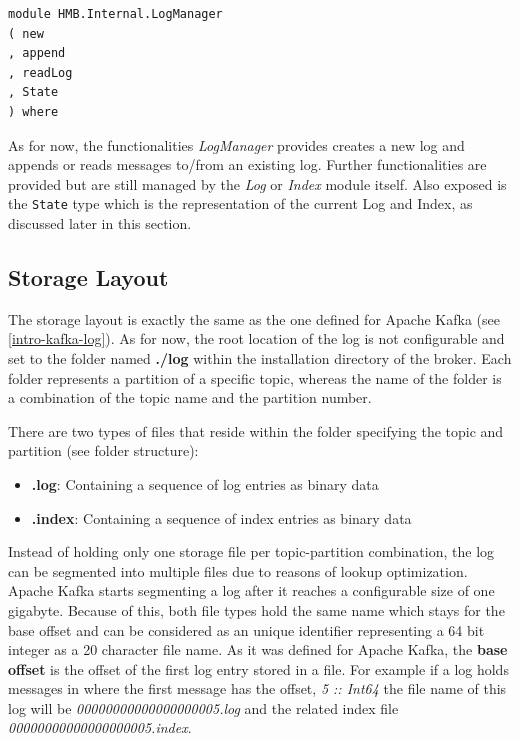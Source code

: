 \begin{lstlisting}
module HMB.Internal.LogManager
( new
, append
, readLog
, State
) where
\end{lstlisting}

As for now, the functionalities \textit{LogManager} provides creates a
new log and appends or reads messages to/from an existing log. Further
functionalities are provided but are still managed by the \textit{Log} or
\textit{Index} module itself. Also exposed is the \lstinline{State} type which is
the representation of the current Log and Index, as discussed later in this
section.

\newpage
\subsection{Storage Layout}
\label{log-broker-storage}

The storage layout is exactly the same as the one defined for Apache Kafka (see
\ref{intro-kafka-log}).  As for now, the root location of the log is not
configurable and set to the folder named \textbf{./log} within the installation
directory of the broker. Each folder represents a partition of a specific topic,
whereas the name of the folder is a combination of the topic name and the
partition number.

There are two types of files that reside within the folder specifying the
topic and partition (see folder structure):
\begin{itemize}
    \item {\bf .log}: Containing a sequence of log entries as binary data
    \item{\bf .index}: Containing a sequence of index entries as binary data
\end{itemize}

Instead of holding only one storage file per topic-partition combination, the
log can be segmented into multiple files due to reasons of lookup optimization.
Apache Kafka starts segmenting a log after it reaches a configurable size of one
gigabyte. Because of this, both file types hold the same name which stays
for the base offset and can be considered as an unique identifier representing a
64 bit integer as a 20 character file name. As it was defined for Apache Kafka,
the \textbf{base offset} is the offset of the first log entry stored in a file.
For example if a log holds messages in where the first message has the offset,
\textit{5 :: Int64} the file name of this log will be
\textit{00000000000000000005.log} and the related index file
\textit{00000000000000000005.index}.


